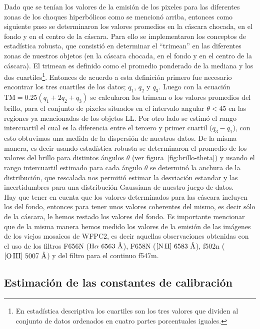 Dado que se tenían los valores de la emisión de los pixeles para las diferentes zonas de los choques hiperbólicos como se mencionó arriba, entonces como siguiente paso se determinaron los valores promedios en la cáscara chocada, en el fondo y en el centro de la cáscara. Para ello se implementaron los conceptos de  estadística robusta, que consistió en determinar el ``trimean'' en las diferentes zonas de nuestros objetos (en la cáscara chocada, en el fondo y en el centro de la cáscara). El trimean es definido como el promedio ponderado de la mediana y los dos cuartiles\footnote{En estadística descriptiva los cuartiles son los tres valores que dividen al conjunto de datos ordenados en cuatro partes porcentuales iguales.}. Entonces de acuerdo a esta definición primero fue necesario encontrar los tres cuartiles de los datos; \(q_{1}\), \(q_{2}\) y \(q_{3}\). Luego con la  ecuación \(\text{TM} = 0.25(q_{1} + 2q_{2} + q_{3})\) se calcularon los trimean o los valores promedios del brillo, para el conjunto de pixeles situados en el intervalo angular \(\theta < 45\) en las regiones ya mencionadas de los objetos LL. Por otro lado se estimó el rango intercuartil el cual es la diferencia entre el tercero y primer cuartil (\(q_{3} - q_{1}\)), con esto obtuvimos una medida de la dispersión de nuestros datos. De la misma manera, es decir usando estadística robusta se determinaron el promedio de los valores del brillo para distintos ángulos \(\theta\) (ver figura~\ref{fig:brillo-theta}) y usando el rango intercuartil estimado para cada ángulo \(\theta\) se determinó la anchura de la distribución, que rescalada nos permitió  estimar la desviación estandar y las incertidumbres para una distribución Gaussiana de nuestro juego de datos. \\
 
Hay que tener en cuenta que los valores determinados para las cáscara incluyen los del fondo, entonces para tener unos valores coherentes del mismo, es decir sólo de la cáscara, le hemos restado los valores del fondo. Es importante mencionar que de la misma manera hemos medido los valores de la emisión de las  imágenes de los viejos  mosaicos de WFPC2, es decir aquellas  observaciones obtenidas con el uso de los filtros F656N (\(\mathrm{\mathrm{H}\alpha~6563~\text{\AA{}}{}}\)), F658N (\(\mathrm{\mathrm{[N\,II]}~6583~\text{\AA{}}{}}\)), f502n (\(\mathrm{[O\,III]}{}~5007~\text{\AA{}}{}\)) y del filtro para el continuo f547m.\\

\subsection{Estimación de las constantes de calibración}

